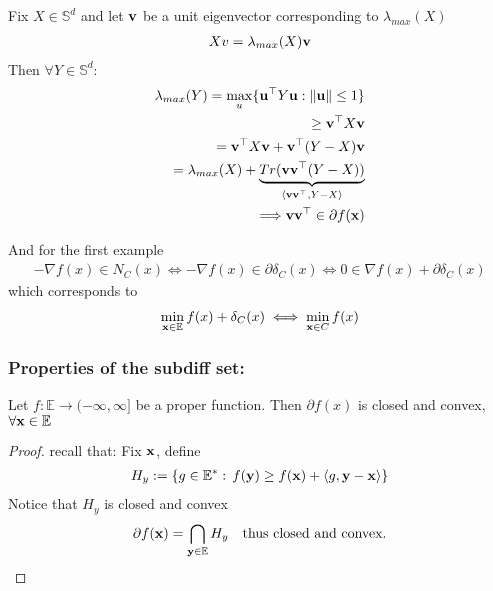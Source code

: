 \documentclass[11pt]{article}
\begin{document}
\begin{example}
\begin{enumerate}
        Fix $X \in \mathbb{S}^{d}$ and let ${\mathbf{v}}$ be a unit eigenvector corresponding to $\lambda_{max}(X)$
        \begin{align*}
            Xv = \lambda_{max}(X){\mathbf{v}} 
        \end{align*}
        Then $\forall Y \in \mathbb{S}^{d}$:
        \begin{align*}
            \lambda_{max}(Y) = \max_{u}\{ \vu^{\top}Y\vu: \| \vu \| \le 1  \} \\
            \ge \vv^{\top}X\vv \\
            = \vv^{\top}X\vv + \vv^{\top}(Y-X)\vv \\
            = \lambda_{max}(X) + \underbrace{Tr(\vv\vv^{\top}(Y-X))}_{\langle \vv \vv^{\top}, Y-X \rangle}\\
            \Longrightarrow \vv \vv^{\top} \in \partial f(\vx)
        \end{align*}
    \end{enumerate}
\end{example}

And for the first example 
\begin{align*}
    -\nabla f(x) \in N_{C}(x) \iff -\nabla f(x) \in \partial \delta_{C}(x) \iff 
    0 \in \nabla f(x) + \partial \delta_{C}(x)
\end{align*}
which corresponds to 
\begin{align*}
    \min_{{\mathbf{x}} \in \mathbb{E}}f(x) + \delta_{C}(x) \iff \min_{{\mathbf{x}} \in C}f(x)
\end{align*}

\subsubsection{Properties of the subdiff set:}
\begin{theorem}
    Let $f: \mathbb{E} \to (-\infty,\infty]$ be a proper function. Then 
    $\partial f(x)$ is closed and convex, $\forall {\mathbf{x}} \in \mathbb{E}$
\end{theorem}
\begin{proof}
    recall that: Fix ${\mathbf{x}}$, define 
    \begin{align*}
        H_y:= \{ g \in \mathbb{E}^{*}: \, f({\mathbf{y}}) \ge f({\mathbf{x}}) + \langle g,{\mathbf{y}}-{\mathbf{x}} \rangle \}
    \end{align*}
    Notice that $H_y$ is closed and convex 
    \begin{align*}
        \partial f({\mathbf{x}}) = \bigcap_{{\mathbf{y}} \in \mathbb{E}}H_y \quad \text{thus closed and convex.}
    \end{align*}
\end{proof}
\end{document}
